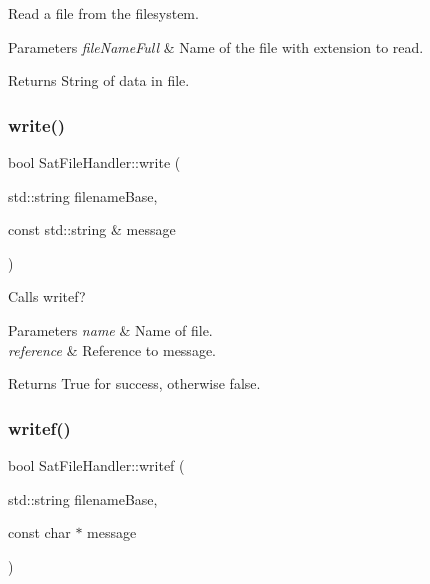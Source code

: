 Read a file from the filesystem. 


\begin{DoxyParams}{Parameters}
{\em file\+Name\+Full} & Name of the file with extension to read. \\
\hline
\end{DoxyParams}
\begin{DoxyReturn}{Returns}
String of data in file. 
\end{DoxyReturn}
\mbox{\label{class_sat_file_handler_a54f30111dd898bc6ce1e0c0ce6a82350}} 
\subsubsection{\texorpdfstring{write()}{write()}}
{\footnotesize\ttfamily bool Sat\+File\+Handler\+::write (\begin{DoxyParamCaption}\item[{std\+::string}]{filename\+Base,  }\item[{const std\+::string \&}]{message }\end{DoxyParamCaption})}



Calls writef? 


\begin{DoxyParams}{Parameters}
{\em name} & Name of file. \\
\hline
{\em reference} & Reference to message. \\
\hline
\end{DoxyParams}
\begin{DoxyReturn}{Returns}
True for success, otherwise false. 
\end{DoxyReturn}
\mbox{\label{class_sat_file_handler_a355361c4ec4692c5b533740121976eb2}} 
\subsubsection{\texorpdfstring{writef()}{writef()}}
{\footnotesize\ttfamily bool Sat\+File\+Handler\+::writef (\begin{DoxyParamCaption}\item[{std\+::string}]{filename\+Base,  }\item[{const char $\ast$}]{message }\end{DoxyParamCaption})}



